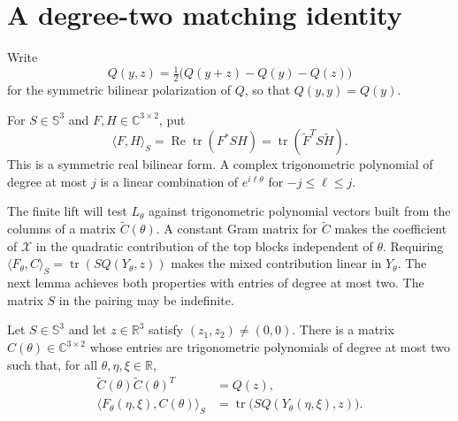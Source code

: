 \section{A degree-two matching identity}\label{sec:matching}

Write
\[
 Q(y,z)=\tfrac12\bigl(Q(y+z)-Q(y)-Q(z)\bigr)
\]
for the symmetric bilinear polarization of $Q$, so that $Q(y,y)=Q(y)$.

For $S\in\mathbb S^3$ and $F,H\in\mathbb C^{3\times2}$, put
\[
 \langle F,H\rangle_S
 =\operatorname{Re}\operatorname{tr}(F^*SH)
 =\operatorname{tr}(\widetilde F^T S\widetilde H).
\]
This is a symmetric real bilinear form.  A complex trigonometric
polynomial of degree at most $j$ is a linear combination of
$e^{i\ell\theta}$ for $-j\leq\ell\leq j$.

The finite lift will test $L_\theta$ against trigonometric polynomial
vectors built from the columns of a matrix $\widetilde C(\theta)$.
A constant Gram matrix for $\widetilde C$ makes the coefficient of
$\mathcal X$ in the quadratic contribution of the top blocks independent
of $\theta$. Requiring
$\langle F_\theta,C\rangle_S=\operatorname{tr}(SQ(Y_\theta,z))$
makes the mixed contribution linear in $Y_\theta$.
The next lemma achieves both properties with entries of
degree at most two. The matrix $S$ in the pairing may be indefinite.

\begin{lemma}\label{lem:matching}
Let $S\in\mathbb S^3$ and let $z\in\mathbb R^3$ satisfy
$(z_1,z_2)\ne(0,0)$.  There is a matrix
$C(\theta)\in\mathbb C^{3\times2}$ whose entries are trigonometric
polynomials of degree at most two such that, for all
$\theta,\eta,\xi\in\mathbb R$,
\begin{equation}\label{eq:matching}
 \begin{aligned}
 \widetilde C(\theta)\widetilde C(\theta)^T&=Q(z),\\
 \langle F_\theta(\eta,\xi),C(\theta)\rangle_S
 &=\operatorname{tr}\bigl(SQ(Y_\theta(\eta,\xi),z)\bigr).
 \end{aligned}
\end{equation}
\end{lemma}

